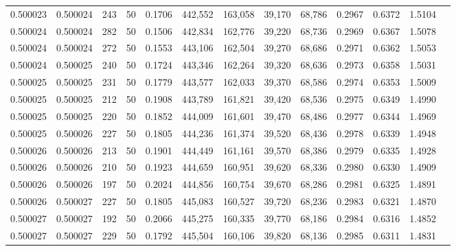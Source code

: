 \begin{tabular}{rrrrrrrrrrrrr}
0.500023 & 0.500024 &   243 &  50 &                                     0.1706 & 442,552 & 163,058 &  39,170 &  68,786 & 0.2967 & 0.6372 & 1.5104 \\
0.500024 & 0.500024 &   282 &  50 &                                     0.1506 & 442,834 & 162,776 &  39,220 &  68,736 & 0.2969 & 0.6367 & 1.5078 \\
0.500024 & 0.500024 &   272 &  50 &                                     0.1553 & 443,106 & 162,504 &  39,270 &  68,686 & 0.2971 & 0.6362 & 1.5053 \\
0.500024 & 0.500025 &   240 &  50 &                                     0.1724 & 443,346 & 162,264 &  39,320 &  68,636 & 0.2973 & 0.6358 & 1.5031 \\
0.500025 & 0.500025 &   231 &  50 &                                     0.1779 & 443,577 & 162,033 &  39,370 &  68,586 & 0.2974 & 0.6353 & 1.5009 \\
0.500025 & 0.500025 &   212 &  50 &                                     0.1908 & 443,789 & 161,821 &  39,420 &  68,536 & 0.2975 & 0.6349 & 1.4990 \\
0.500025 & 0.500025 &   220 &  50 &                                     0.1852 & 444,009 & 161,601 &  39,470 &  68,486 & 0.2977 & 0.6344 & 1.4969 \\
0.500025 & 0.500026 &   227 &  50 &                                     0.1805 & 444,236 & 161,374 &  39,520 &  68,436 & 0.2978 & 0.6339 & 1.4948 \\
0.500026 & 0.500026 &   213 &  50 &                                     0.1901 & 444,449 & 161,161 &  39,570 &  68,386 & 0.2979 & 0.6335 & 1.4928 \\
0.500026 & 0.500026 &   210 &  50 &                                     0.1923 & 444,659 & 160,951 &  39,620 &  68,336 & 0.2980 & 0.6330 & 1.4909 \\
0.500026 & 0.500026 &   197 &  50 &                                     0.2024 & 444,856 & 160,754 &  39,670 &  68,286 & 0.2981 & 0.6325 & 1.4891 \\
0.500026 & 0.500027 &   227 &  50 &                                     0.1805 & 445,083 & 160,527 &  39,720 &  68,236 & 0.2983 & 0.6321 & 1.4870 \\
0.500027 & 0.500027 &   192 &  50 &                                     0.2066 & 445,275 & 160,335 &  39,770 &  68,186 & 0.2984 & 0.6316 & 1.4852 \\
0.500027 & 0.500027 &   229 &  50 &                                     0.1792 & 445,504 & 160,106 &  39,820 &  68,136 & 0.2985 & 0.6311 & 1.4831 \\

\end{tabular}
